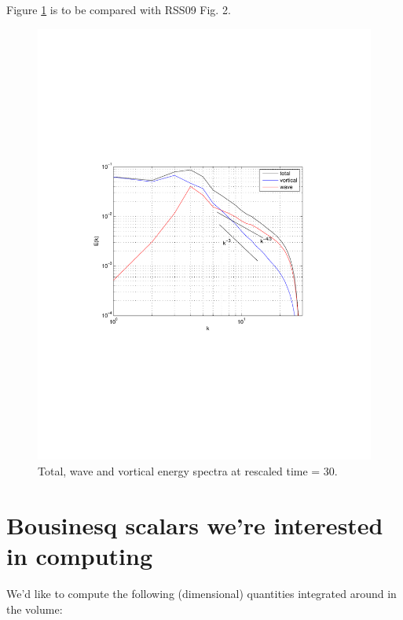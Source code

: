 \documentclass[12pt]{article}
\begin{document}
Figure \ref{Fig2_H} is to be compared with RSS09 Fig. 2.
\begin{figure}[ht]
\centering
\includegraphics[scale = .7]{RSS09_Fig2_UH}
\caption{Total, wave and vortical energy spectra at rescaled time = 30.}
\label{Fig2_H}
\end{figure}


\section{Bousinesq scalars we're interested in computing}

We'd like to compute the following (dimensional) quantities integrated
around in the volume:
\end{document}
